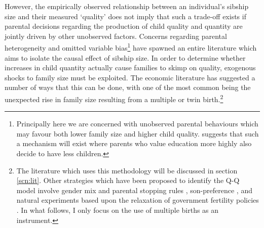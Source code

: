 \documentclass{article}[11pt,subeqn]
\begin{document}
\begin{spacing}{1.25}
However, the empirically observed relationship between an individual's sibship size and their measured `quality' does not imply that such a trade-off exists if parental decisions 
regarding the production of child quality and quantity are jointly driven by other unobserved factors.  Concerns regarding parental heterogeneity and omitted variable 
bias\footnote{Principally here we are concerned with unobserved parental behaviours which may favour both lower family size and higher child quality.  \citet{Qian2009} 
suggests that such a mechanism will exist where parents who value education more highly also decide to have less children.} have spawned an entire literature which aims to 
isolate the causal effect of sibship size.  In order to determine whether increases in child quantity actually cause families to skimp on quality, exogenous shocks to family 
size must be exploited.  The economic literature has suggested a number of ways that this can be done, with one of the most common being the unexpected rise in family size 
resulting from a multiple or twin birth.\footnote{The literature which uses this methodology will be discussed in section \ref{scn:lit}.  Other strategies which have been proposed 
to identify the Q-Q model involve gender mix and parental stopping rules \citep{ConleyGlauber2006}, son-preference \citep{Lee2008}, and natural experiments based upon the 
relaxation of government fertility policies \citep{Qian2009}.   In what follows, I only focus on the use of multiple births as an instrument.}


\end{spacing}
\end{document}
